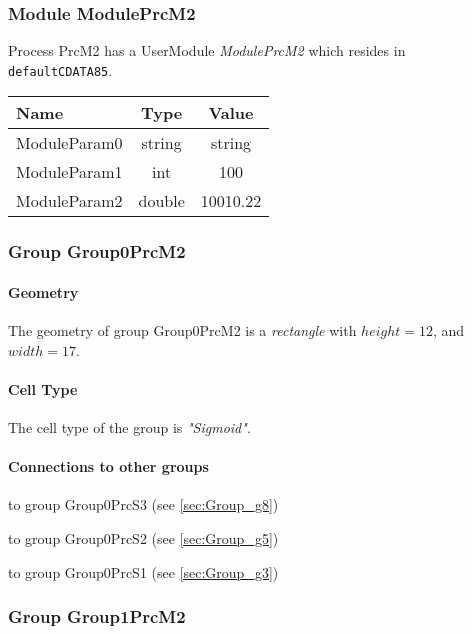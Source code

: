 \documentclass[a4paper, 11pt]{article}
\begin{document}
\subsubsection{Module ModulePrcM2}
Process PrcM2 has a UserModule \emph{ModulePrcM2} which resides in
\verb!defaultCDATA85!.

\begin{center}
\begin{tabular}{l|c|c}
Name & Type & Value\\\hline
ModuleParam0 & string & string\\
ModuleParam1 & int & 100\\
ModuleParam2 & double & 10010.22\\
\end{tabular}
\end{center}

\subsubsection{Group Group0PrcM2}
\label{sec:Group_g1}

\paragraph*{Geometry}

The geometry of group Group0PrcM2 is a \emph{rectangle} with
$height= 12$, and $width= 17$.

\paragraph*{Cell Type}
The cell type of the group is \emph{"Sigmoid"}.
\paragraph*{Connections to other groups}
\begin{compactenum}
\item to group Group0PrcS3 (see \ref{sec:Group_g8})
\item to group Group0PrcS2 (see \ref{sec:Group_g5})
\item to group Group0PrcS1 (see \ref{sec:Group_g3})
\end{compactenum}

\subsubsection{Group Group1PrcM2}
\label{sec:Group_g2}
\end{document}
